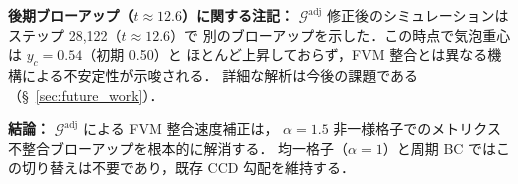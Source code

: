 \noindent\textbf{後期ブローアップ（$t\approx12.6$）に関する注記：}
$\mathcal{G}^\text{adj}$ 修正後のシミュレーションはステップ 28{,}122（$t\approx12.6$）で
別のブローアップを示した．この時点で気泡重心は $y_c = 0.54$（初期 0.50）と
ほとんど上昇しておらず，FVM 整合とは異なる機構による不安定性が示唆される．
詳細な解析は今後の課題である（§~\ref{sec:future_work}）．

\noindent\textbf{結論：}
$\mathcal{G}^\text{adj}$ による FVM 整合速度補正は，
$\alpha=1.5$ 非一様格子でのメトリクス不整合ブローアップを根本的に解消する．
均一格子（$\alpha=1$）と周期 BC ではこの切り替えは不要であり，既存 CCD 勾配を維持する．
